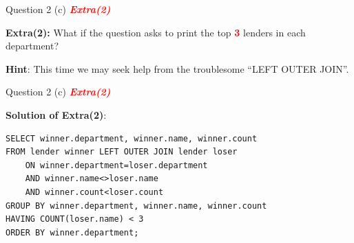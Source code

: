 \begin{frame}[fragile]{Question 2 (c) \textcolor{red}{\textit{\textbf{Extra(2)}}}}
	
\textbf{Extra(2):} What if the question asks to print the top \textcolor{red}{\textbf{3}} lenders in each department?

\textbf{Hint}: This time we may seek help from the troublesome ``LEFT OUTER JOIN''.
\end{frame}

\begin{frame}[fragile]{Question 2 (c) \textcolor{red}{\textit{\textbf{Extra(2)}}}}
	
\textbf{Solution of Extra(2)}:
\begin{lstlisting}
SELECT winner.department, winner.name, winner.count 
FROM lender winner LEFT OUTER JOIN lender loser
	ON winner.department=loser.department 
	AND winner.name<>loser.name 
	AND winner.count<loser.count
GROUP BY winner.department, winner.name, winner.count 
HAVING COUNT(loser.name) < 3
ORDER BY winner.department;
\end{lstlisting}
 
\end{frame}

